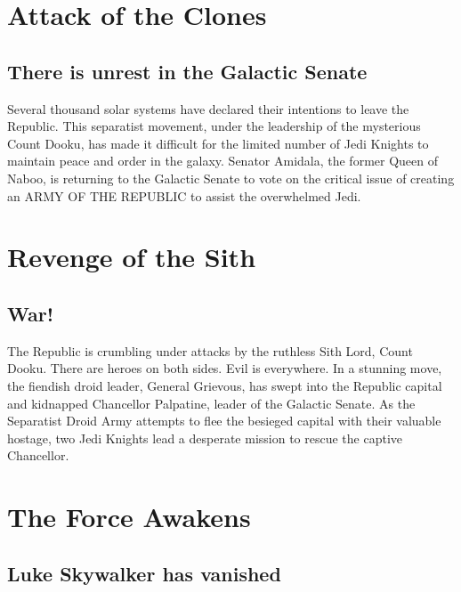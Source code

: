 \documentclass[oneside]{ifgw}
\begin{document}
\lipsum[1-10]


\chapter{Attack of the Clones}	

\section{There is unrest in the Galactic Senate}

Several thousand solar systems have declared their intentions to leave the Republic. This separatist movement, under the leadership of the mysterious Count Dooku, has made it difficult for the limited number of Jedi Knights to maintain peace and order in the galaxy. Senator Amidala, the former Queen of Naboo, is returning to the Galactic Senate to vote on the critical issue of creating an ARMY OF THE REPUBLIC to assist the overwhelmed Jedi.

\lipsum[1-10]


\chapter{Revenge of the Sith}	

\section{War!}

The Republic is crumbling under attacks by the ruthless Sith Lord, Count Dooku. There are heroes on both sides. Evil is everywhere. In a stunning move, the fiendish droid leader, General Grievous, has swept into the Republic capital and kidnapped Chancellor Palpatine, leader of the Galactic Senate. As the Separatist Droid Army attempts to flee the besieged capital with their valuable hostage, two Jedi Knights lead a desperate mission to rescue the captive Chancellor.

\lipsum[1-10]

\chapter{The Force Awakens}

\section{Luke Skywalker has vanished}
\end{document}
